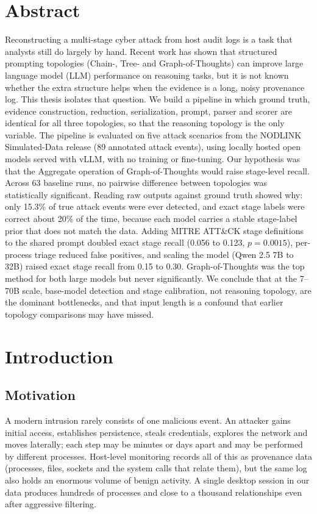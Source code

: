\documentclass[a4paper, 12pt]{report}
\theoremstyle{definition}
\begin{document}
\chapter*{Abstract}
Reconstructing a multi-stage cyber attack from host audit logs is a task that analysts still do largely by hand. Recent work has shown that structured prompting topologies (Chain-, Tree- and Graph-of-Thoughts) can improve large language model (LLM) performance on reasoning tasks, but it is not known whether the extra structure helps when the evidence is a long, noisy provenance log. This thesis isolates that question. We build a pipeline in which ground truth, evidence construction, reduction, serialization, prompt, parser and scorer are identical for all three topologies, so that the reasoning topology is the only variable. The pipeline is evaluated on five attack scenarios from the NODLINK Simulated-Data release (89 annotated attack events), using locally hosted open models served with vLLM, with no training or fine-tuning. Our hypothesis was that the Aggregate operation of Graph-of-Thoughts would raise stage-level recall. Across 63 baseline runs, no pairwise difference between topologies was statistically significant. Reading raw outputs against ground truth showed why: only 15.3\% of true attack events were ever detected, and exact stage labels were correct about 20\% of the time, because each model carries a stable stage-label prior that does not match the data. Adding MITRE ATT\&CK stage definitions to the shared prompt doubled exact stage recall (0.056 to 0.123, $p=0.0015$), per-process triage reduced false positives, and scaling the model (Qwen 2.5 7B to 32B) raised exact stage recall from 0.15 to 0.30. Graph-of-Thoughts was the top method for both large models but never significantly. We conclude that at the 7--70B scale, base-model detection and stage calibration, not reasoning topology, are the dominant bottlenecks, and that input length is a confound that earlier topology comparisons may have missed.

\clearpage
{}
\setcounter{page}{1}
\chapter{Introduction}
\label{chap.1}
\section{Motivation}
A modern intrusion rarely consists of one malicious event. An attacker gains initial access, establishes persistence, steals credentials, explores the network and moves laterally; each step may be minutes or days apart and may be performed by different processes. Host-level monitoring records all of this as provenance data (processes, files, sockets and the system calls that relate them), but the same log also holds an enormous volume of benign activity. A single desktop session in our data produces hundreds of processes and close to a thousand relationships even after aggressive filtering.
\end{document}
